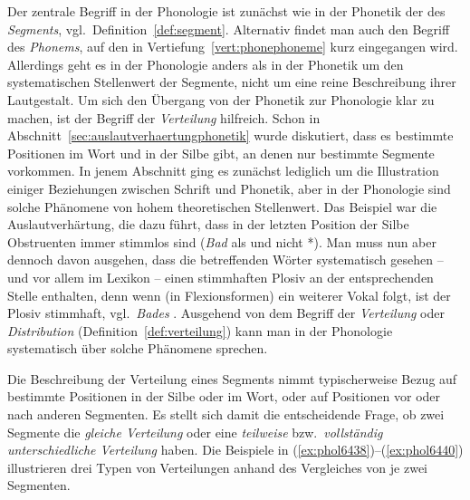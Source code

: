 Der zentrale Begriff in der Phonologie ist zunächst wie in der Phonetik der des \textit{Segments}, vgl.\ Definition~\ref{def:segment}.
Alternativ findet man auch den Begriff des \textit{Phonems}, auf den in Vertiefung~\ref{vert:phonephoneme} kurz eingegangen wird.
Allerdings geht es in der Phonologie anders als in der Phonetik um den systematischen Stellenwert der Segmente, nicht um eine reine Beschreibung ihrer Lautgestalt.
Um sich den Übergang von der Phonetik zur Phonologie klar zu machen, ist der Begriff der \textit{Verteilung} hilfreich.
Schon in Abschnitt~\ref{sec:auslautverhaertungphonetik} wurde diskutiert, dass es bestimmte Positionen im Wort und in der Silbe gibt, an denen nur bestimmte Segmente vorkommen.
In jenem Abschnitt ging es zunächst lediglich um die Illustration einiger Beziehungen zwischen Schrift und Phonetik, aber in der Phonologie sind solche Phänomene von hohem theoretischen Stellenwert.
Das Beispiel war die Auslautverhärtung, die dazu führt, dass in der letzten Position der Silbe Obstruenten immer stimmlos sind (\textit{Bad} als \textipa{[ba:t]} und nicht *\textipa{[ba:d]}).
Man muss nun aber dennoch davon ausgehen, dass die betreffenden Wörter systematisch gesehen -- und vor allem im Lexikon -- einen stimmhaften Plosiv an der entsprechenden Stelle enthalten, denn wenn (\zB in Flexionsformen) ein weiterer Vokal folgt, ist der Plosiv stimmhaft, vgl.\ \textit{Bades} .
Ausgehend von dem Begriff der \textit{Verteilung} oder \textit{Distribution} (Definition~\ref{def:verteilung}) kann man in der Phonologie systematisch über solche Phänomene sprechen.


Die Beschreibung der Verteilung eines Segments nimmt typischerweise Bezug auf bestimmte Positionen in der Silbe oder im Wort, oder auf Positionen vor oder nach anderen Segmenten.
Es stellt sich damit die entscheidende Frage, ob zwei Segmente die \textit{gleiche Verteilung} oder eine \textit{teilweise} bzw.\ \textit{vollständig unterschiedliche Verteilung} haben.
Die Beispiele in (\ref{ex:phol6438})--(\ref{ex:phol6440}) illustrieren drei Typen von Verteilungen anhand des Vergleiches von je zwei Segmenten.


